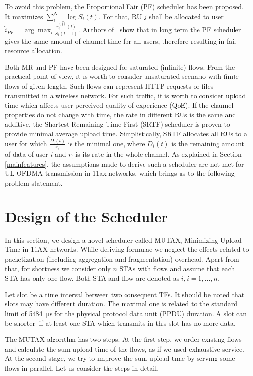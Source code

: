 To avoid this problem, the Proportional Fair (PF) scheduler has been proposed.
It maximizes $\sum_{i=1}^{N} \log{S_i(t)}$.
For that, RU $j$ shall be allocated to user $\hat{i}_{PF}= \arg \max_i \frac{r_i^{(j)}(t)}{S_{i}(t-1)}.$
Authors of~\cite{kwan2009proportional} show that in long term the PF scheduler gives the same amount of channel time for all users, therefore resulting in fair resource allocation.

Both MR and PF have been designed for saturated (infinite) flows.
From the practical point of view, it is worth to consider unsaturated scenario with finite flows of given length.
Such flows can represent HTTP requests or files transmitted in a wireless network.
For such traffic, it is worth to consider upload time which affects user perceived quality of experience (QoE).
If the channel properties do not change with time, the rate in different RUs is the same and additive, the Shortest Remaining Time First (SRTF) scheduler is proven to provide minimal average upload time.
Simplistically, SRTF allocates all RUs to a user for which $\frac{D_i(t)}{r_i}$ is the minimal one, where $D_i(t)$ is the remaining amount of data of user $i$ and $r_i$ is its rate in the whole channel.
As explained in Section \ref{mainfeatures}, the assumptions made to derive such a scheduler are not met for UL OFDMA transmission in 11ax networks, which brings us to the following problem statement.


\section{Design of the Scheduler}
In this section, we design a novel scheduler called MUTAX, Minimizing Upload Time in 11AX networks. While deriving formulae we neglect the effects related to packetization (including aggregation and fragmentation) overhead. Apart from that, for shortness we consider only $n$ STAs with flows and assume that each STA has only one flow. Both STA and flow are denoted as $i, i=1,...,n$.

Let slot be a time interval between two consequent TFs.
It should be noted that slots may have different duration. The maximal one is related to the standard limit of \SI{5484}{\us} for the physical protocol data unit (PPDU) duration. A slot can be shorter, if at least one STA which transmits in this slot has no more data.

The MUTAX algorithm has two steps. At the first step, we order existing flows and calculate the sum upload time of the flows, as if we used exhaustive service.
At the second stage, we try to improve the sum upload time by serving some flows in parallel.
Let us consider the steps in detail.

